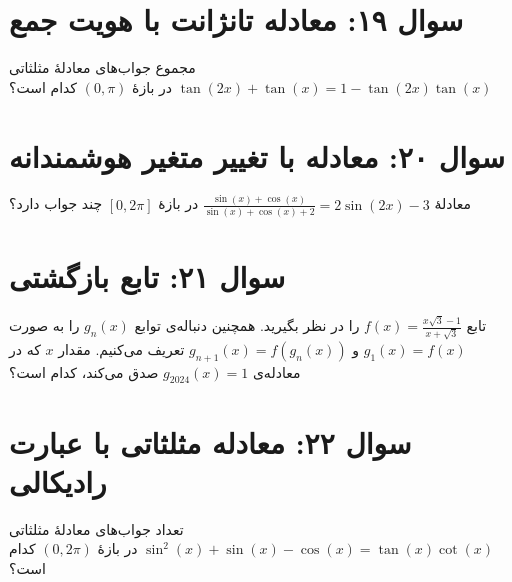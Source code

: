 \documentclass[12pt]{article}
\begin{document}
	\section*{سوال ۱۹: معادله تانژانت با هویت جمع}
	مجموع جواب‌های معادلهٔ مثلثاتی \( \tan(2x) + \tan(x) = 1 - \tan(2x)\tan(x) \) در بازهٔ \( (0, \pi) \) کدام است؟
	
	
	\vspace{1cm}
	\hrulefill
	\vspace{1cm}
	\section*{سوال ۲۰: معادله با تغییر متغیر هوشمندانه}
	معادلهٔ \( \frac{\sin(x)+\cos(x)}{\sin(x)+\cos(x)+2} = 2\sin(2x)-3 \) در بازهٔ \( [0, 2\pi] \) چند جواب دارد؟
	
	
	\vspace{1cm}
	\hrulefill
	\vspace{1cm}
	\section*{سوال ۲۱: تابع بازگشتی}
	تابع \( f(x) = \frac{x\sqrt{3} - 1}{x + \sqrt{3}} \) را در نظر بگیرید. همچنین دنباله‌ی توابع \( g_n(x) \) را به صورت \( g_1(x) = f(x) \) و \( g_{n+1}(x) = f(g_n(x)) \) تعریف می‌کنیم. مقدار \(x\) که در معادله‌ی \( g_{2024}(x) = 1 \) صدق می‌کند، کدام است؟


	\vspace{1cm}
	\hrulefill
	\vspace{1cm}
	\section*{سوال ۲۲: معادله مثلثاتی با عبارت رادیکالی}
	
	تعداد جواب‌های معادلهٔ مثلثاتی \( \sin^2(x) + \sin(x) - \cos(x) = \tan(x)\cot(x) \) در بازهٔ \( (0, 2\pi) \) کدام است؟
	
	
	\vspace{1cm}
	\hrulefill
	\vspace{1cm}
\end{document}
